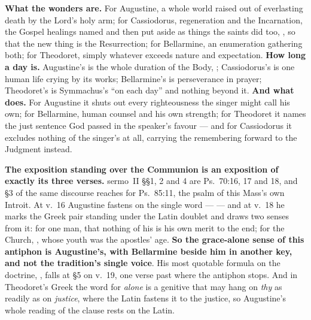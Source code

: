 \textbf{What the wonders are.} For Augustine, a whole world raised out of
everlasting death by the Lord's holy arm; for Cassiodorus, regeneration and the
Incarnation, the Gospel healings named and then put aside as things the saints
did too, , so that the new thing is the
Resurrection; for Bellarmine, an enumeration gathering both; for Theodoret,
simply whatever exceeds nature and expectation. \textbf{How long a day is.}
Augustine's  is the whole duration of the Body, ;
Cassiodorus's is one human life crying by its works; Bellarmine's is
perseverance in prayer; Theodoret's is Symmachus's ``on each day'' and nothing
beyond it. \textbf{And what  does.} For
Augustine it shuts out every righteousness the singer might call his own; for
Bellarmine, human counsel and his own strength; for Theodoret it names the just
sentence God passed in the speaker's favour --- and for Cassiodorus it excludes
nothing of the singer's at all, carrying the remembering forward to the Judgment
instead.

\textbf{The exposition standing over the Communion is an exposition of exactly
its three verses.}  sermo~II \S\S1, 2 and 4 are
Ps.~70:16, 17 and 18, and \S3 of the same discourse reaches for Ps.~85:11, the
psalm of this Mass's own Introit. At v.~16 Augustine fastens on the single word
--- 
--- and at v.~18 he marks the Greek pair standing under the Latin doublet
 and draws two senses from it: for one man, that
nothing of his is his own merit to the end; for the Church, , whose youth was the apostles' age. \textbf{So the grace-alone sense
of this antiphon is Augustine's, with Bellarmine beside him in another key, and
not the tradition's single voice}. His most
quotable formula on the doctrine, ,
falls at \S5 on v.~19, one verse past where the antiphon stops. And in
Theodoret's Greek the word for \emph{alone} is a genitive that may hang on
\emph{thy} as readily as on \emph{justice}, where the Latin fastens it to the
justice, so Augustine's whole reading of the clause rests on the Latin.

